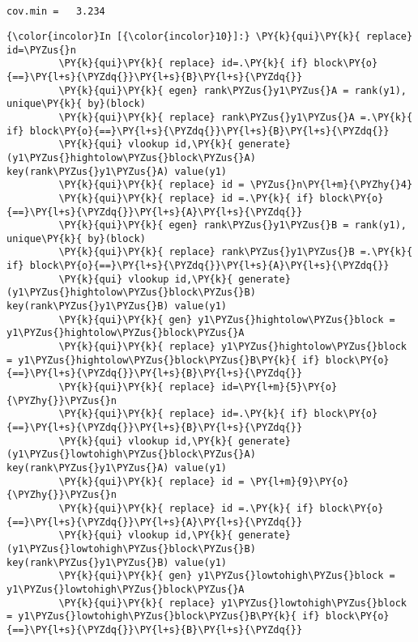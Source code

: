 \documentclass[11pt,notitlepage]{article}\usepackage[]{graphicx}\usepackage[]{color}
\makeatletter
\newenvironment{kframe}{%
 \def\at@end@of@kframe{}%
 \ifinner\ifhmode%
  \def\at@end@of@kframe{\end{minipage}}%
  \begin{minipage}{\columnwidth}%
 \fi\fi%
 \def\FrameCommand##1{\hskip\@totalleftmargin \hskip-\fboxsep
 \colorbox{shadecolor}{##1}\hskip-\fboxsep
     \hskip-\linewidth \hskip-\@totalleftmargin \hskip\columnwidth}%
 \MakeFramed {\advance\hsize-\width
   \@totalleftmargin\z@ \linewidth\hsize
   \@setminipage}}%
 {\par\unskip\endMakeFramed%
 \at@end@of@kframe}
\newenvironment{knitrout}{}{} %
\makeatother
\begin{document}
\begin{knitrout}
\begin{kframe}
    \begin{Verbatim}[commandchars=\\\{\}]


cov.min =   3.234

    \end{Verbatim}

    \begin{Verbatim}[commandchars=\\\{\}]
{\color{incolor}In [{\color{incolor}10}]:} \PY{k}{qui}\PY{k}{ replace} id=\PYZus{}n
         \PY{k}{qui}\PY{k}{ replace} id=.\PY{k}{ if} block\PY{o}{==}\PY{l+s}{\PYZdq{}}\PY{l+s}{B}\PY{l+s}{\PYZdq{}}
         \PY{k}{qui}\PY{k}{ egen} rank\PYZus{}y1\PYZus{}A = rank(y1), unique\PY{k}{ by}(block)
         \PY{k}{qui}\PY{k}{ replace} rank\PYZus{}y1\PYZus{}A =.\PY{k}{ if} block\PY{o}{==}\PY{l+s}{\PYZdq{}}\PY{l+s}{B}\PY{l+s}{\PYZdq{}}
         \PY{k}{qui} vlookup id,\PY{k}{ generate}(y1\PYZus{}hightolow\PYZus{}block\PYZus{}A) key(rank\PYZus{}y1\PYZus{}A) value(y1)
         \PY{k}{qui}\PY{k}{ replace} id = \PYZus{}n\PY{l+m}{\PYZhy{}4}
         \PY{k}{qui}\PY{k}{ replace} id =.\PY{k}{ if} block\PY{o}{==}\PY{l+s}{\PYZdq{}}\PY{l+s}{A}\PY{l+s}{\PYZdq{}}
         \PY{k}{qui}\PY{k}{ egen} rank\PYZus{}y1\PYZus{}B = rank(y1), unique\PY{k}{ by}(block)
         \PY{k}{qui}\PY{k}{ replace} rank\PYZus{}y1\PYZus{}B =.\PY{k}{ if} block\PY{o}{==}\PY{l+s}{\PYZdq{}}\PY{l+s}{A}\PY{l+s}{\PYZdq{}}
         \PY{k}{qui} vlookup id,\PY{k}{ generate}(y1\PYZus{}hightolow\PYZus{}block\PYZus{}B) key(rank\PYZus{}y1\PYZus{}B) value(y1)
         \PY{k}{qui}\PY{k}{ gen} y1\PYZus{}hightolow\PYZus{}block = y1\PYZus{}hightolow\PYZus{}block\PYZus{}A
         \PY{k}{qui}\PY{k}{ replace} y1\PYZus{}hightolow\PYZus{}block = y1\PYZus{}hightolow\PYZus{}block\PYZus{}B\PY{k}{ if} block\PY{o}{==}\PY{l+s}{\PYZdq{}}\PY{l+s}{B}\PY{l+s}{\PYZdq{}}
         \PY{k}{qui}\PY{k}{ replace} id=\PY{l+m}{5}\PY{o}{\PYZhy{}}\PYZus{}n
         \PY{k}{qui}\PY{k}{ replace} id=.\PY{k}{ if} block\PY{o}{==}\PY{l+s}{\PYZdq{}}\PY{l+s}{B}\PY{l+s}{\PYZdq{}}
         \PY{k}{qui} vlookup id,\PY{k}{ generate}(y1\PYZus{}lowtohigh\PYZus{}block\PYZus{}A) key(rank\PYZus{}y1\PYZus{}A) value(y1)
         \PY{k}{qui}\PY{k}{ replace} id = \PY{l+m}{9}\PY{o}{\PYZhy{}}\PYZus{}n
         \PY{k}{qui}\PY{k}{ replace} id =.\PY{k}{ if} block\PY{o}{==}\PY{l+s}{\PYZdq{}}\PY{l+s}{A}\PY{l+s}{\PYZdq{}}
         \PY{k}{qui} vlookup id,\PY{k}{ generate}(y1\PYZus{}lowtohigh\PYZus{}block\PYZus{}B) key(rank\PYZus{}y1\PYZus{}B) value(y1)
         \PY{k}{qui}\PY{k}{ gen} y1\PYZus{}lowtohigh\PYZus{}block = y1\PYZus{}lowtohigh\PYZus{}block\PYZus{}A
         \PY{k}{qui}\PY{k}{ replace} y1\PYZus{}lowtohigh\PYZus{}block = y1\PYZus{}lowtohigh\PYZus{}block\PYZus{}B\PY{k}{ if} block\PY{o}{==}\PY{l+s}{\PYZdq{}}\PY{l+s}{B}\PY{l+s}{\PYZdq{}}
\end{Verbatim}


\end{kframe}
\end{knitrout}
\end{document}
